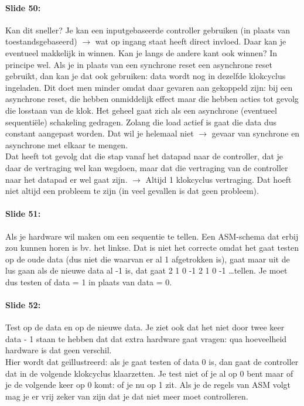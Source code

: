 \documentclass[10pt,a4paper]{book}
\begin{document}
\paragraph{Slide 50:} Kan dit sneller? Je kan een inputgebaseerde controller gebruiken (in plaats van toestandsgebaseerd) $\rightarrow$ wat op ingang staat heeft direct invloed. Daar kan je eventueel makkelijk in winnen. Kan je langs de andere kant ook winnen? In principe wel. Als je in plaats van een synchrone reset een asynchrone reset gebruikt, dan kan je dat ook gebruiken: data wordt nog in dezelfde klokcyclus ingeladen. Dit doet men minder omdat daar gevaren aan gekoppeld zijn: bij een asynchrone reset, die hebben onmiddelijk effect maar die hebben acties tot gevolg die losstaan van de klok. Het geheel gaat zich als een asynchrone (eventueel sequenti\"ele) schakeling gedragen.
Zolang die load actief is gaat die data dus constant aangepast worden. Dat wil je helemaal niet $\rightarrow$ gevaar van synchrone en asynchrone met elkaar te mengen.\\
Dat heeft tot gevolg dat die stap vanaf het datapad naar de controller, dat je daar de vertraging wel kan wegdoen, maar dat die vertraging van de controller naar het datapad er wel gaat zijn. $\rightarrow$ Altijd 1 klokcyclus vertraging. Dat hoeft niet altijd een probleem te zijn (in veel gevallen is dat geen probleem).

\paragraph{Slide 51:} Als je hardware wil maken om een sequentie te tellen. Een ASM-schema dat erbij zou kunnen horen is bv. het linkse. Dat is niet het correcte omdat het gaat testen op de oude data (dus niet die waarvan er al 1 afgetrokken is), gaat maar uit de lus gaan als de nieuwe data al -1 is, dat gaat 2 1 0 -1 2 1 0 -1 \ldots tellen. Je moet dus testen of data = 1 in plaats van data = 0.

\paragraph{Slide 52:} Test op de data en op de nieuwe data. Je ziet ook dat het niet door twee keer data - 1 staan te hebben dat dat extra hardware gaat vragen: qua hoeveelheid hardware is dat geen verschil.\\
Hier wordt dat ge\"illustreerd: als je gaat testen of data 0 is, dan gaat de controller dat in de volgende klokcyclus klaarzetten. Je test niet of je al op 0 bent maar of je de volgende keer op 0 komt: of je nu op 1 zit. Als je de regels van ASM volgt mag je er vrij zeker van zijn dat je dat niet meer moet controlleren. 
\end{document}
